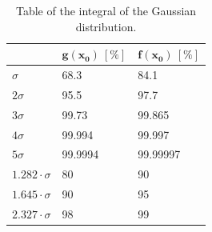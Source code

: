 \documentclass[10pt, titlepage, a4paper]{article}
\numberwithin{equation}{section}
\begin{document}
\begin{table}[H]
    \centering
    \begin{tabular}{|l|l|l|}
    \hline
    \rowcolor[HTML]{FFCCC9} 
    \multicolumn{1}{|c|}{\cellcolor[HTML]{FFCCC9}$\bm{x_0}$} &
    \multicolumn{1}{c|}{\cellcolor[HTML]{FFCCC9}$\bm{g(x_0)}\>[\%]$} &
    \multicolumn{1}{c|}{\cellcolor[HTML]{FFCCC9}$\bm{f(x_0)}\>[\%]$} \\ \hline
    $\sigma$           & 68.3    & 84.1     \\ \hline
    $2\sigma$          & 95.5    & 97.7     \\ \hline
    $3\sigma$          & 99.73   & 99.865   \\ \hline
    $4\sigma$          & 99.994  & 99.997   \\ \hline
    $5\sigma$          & 99.9994 & 99.99997 \\ \hline
    $1.282\cdot\sigma$ & 80      & 90       \\ \hline
    $1.645\cdot\sigma$ & 90      & 95       \\ \hline
    $2.327\cdot\sigma$ & 98      & 99       \\ \hline
\end{tabular}
\caption{Table of the integral of the Gaussian distribution.}
\label{tab:gaussian-integral}
\end{table}
\end{document}
